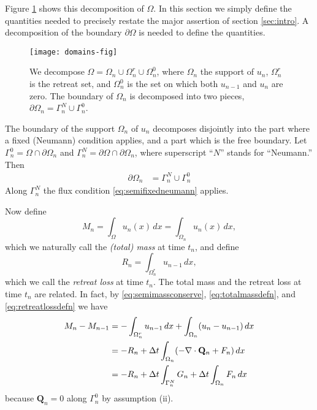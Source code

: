 \documentclass[final,leqno,onefignum,onetabnum]{siamltex1213bueler}
\newcommand\bQ{\mathbf{Q}}
\newcommand{\Div}{\nabla\cdot}
\begin{document}
Figure \ref{fig:domains} shows this decomposition of $\Omega$.  In this section we simply define the quantities needed to precisely restate the major assertion of section \ref{sec:intro}.  A decomposition of the boundary $\partial \Omega$ is needed to define the quantities.

\begin{figure}[ht]
\begin{center}
\texttt{[image: domains-fig]}
\end{center}
\caption{We decompose $\Omega = \Omega_n \cup \Omega_n^r \cup \Omega_n^0$, where $\Omega_n$ the support of $u_n$, $\Omega_n^r$ is the retreat set, and $\Omega_n^0$ is the set on which both $u_{n-1}$ and $u_n$ are zero.  The boundary of $\Omega_n$ is decomposed into two pieces, $\partial\Omega_n = \Gamma_n^N \cup \Gamma_n^0$.}
\label{fig:domains}
\end{figure}

The boundary of the support $\Omega_n$ of $u_n$ decomposes disjointly into the part where a fixed (Neumann) condition applies, and a part which is the free boundary.  Let $\Gamma_n^0 = \Omega \cap \partial \Omega_n$ and $\Gamma_n^N = \partial \Omega \cap \partial \Omega_n$, where superscript ``$N$'' stands for ``Neumann.''  Then
\begin{align*}
\partial\Omega_n &= \Gamma_n^N \cup \Gamma_n^0
\end{align*}
Along $\Gamma_n^N$ the flux condition \eqref{eq:semifixedneumann} applies.

Now define
\begin{equation}
M_n = \int_\Omega u_n(x)\,dx = \int_{\Omega_n} u_n(x)\,dx, \label{eq:totalmassdefn}
\end{equation}
which we naturally call the \emph{(total) mass} at time $t_n$, and define
\begin{equation}
R_n = \int_{\Omega_n^r} u_{n-1}\,dx, \label{eq:retreatlossdefn}
\end{equation}
which we call the \emph{retreat loss} at time $t_n$.  The total mass and the retreat loss at time $t_n$ are related.  In fact, by \eqref{eq:semimassconserve}, \eqref{eq:totalmassdefn}, and \eqref{eq:retreatlossdefn} we have
\begin{align}
M_n - M_{n-1} &=  - \int_{\Omega_n^r} u_{n-1}\,dx + \int_{\Omega_n} (u_n - u_{n-1})\,dx \label{eq:massstep} \\
   &= - R_n + \Delta t \int_{\Omega_n} (- \Div \bQ_n + F_n) \,dx \notag \\
   &= - R_n + \Delta t \int_{\Gamma_n^N} G_n + \Delta t \int_{\Omega_n} F_n\,dx \notag
\end{align}
because $\bQ_n=0$ along $\Gamma_n^0$ by assumption (ii).
\end{document}
